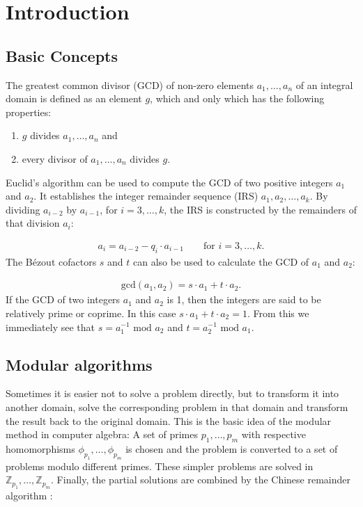 \section{Introduction}

\subsection{Basic Concepts}

The greatest common divisor (GCD) of non-zero elements $a_1, \dots{}, a_n$ of an integral domain is defined as an element $g$, which and only which has the following properties:

\begin{enumerate}
    \item $g$ divides $a_1, \dots{}, a_n$ and
    \item every divisor of $a_1, \dots{}, a_n$ divides $g$.
\end{enumerate}Euclid's algorithm can be used to compute the GCD of two positive integers $a_1$ and $a_2$. It establishes the integer remainder sequence (IRS) \mbox{$a_1, a_2, \dots{}, a_k$}. By dividing $a_{i-2}$ by $a_{i-1}$, for \mbox{$i = 3, \dots{}, k$}, the IRS is constructed by the remainders of that division $a_i$:

\begin{align}
a_i = a_{i-2} - q_i \cdot a_{i-1} \qquad \text{for }  i = 3, \dots{}, k.
\end{align}The  Bézout cofactors $s$ and $t$ can also be used to calculate the GCD of $a_1$ and $a_2$:

\begin{align}
\text{gcd}(a_1, a_2) = s \cdot a_1 + t \cdot a_2.
\end{align}If the GCD of two integers $a_1$ and $a_2$ is 1, then the integers are said to be relatively prime or coprime. In this case \mbox{$s \cdot a_1 + t \cdot a_2 = 1$}. From this we immediately see that $s = a_1^{-1}\text{ mod }a_2$ and $t = a_2^{-1}\text{ mod }a_1$.

\subsection{Modular algorithms}

Sometimes it is easier not to solve a problem directly, but to transform it into another domain, solve the corresponding problem in that domain and transform the result back to the original domain. This is the basic idea of the modular method in computer algebra: A set of primes $p_1, \dots{}, p_m$ with respective homomorphisms $\phi_{p_1}, \dots{}, \phi_{p_m}$ is chosen and the problem is converted to a set of problems modulo different primes. These simpler problems are solved in $\mathbb{Z}_{p_1}, \dots{}, \mathbb{Z}_{p_m}$. Finally, the partial solutions are combined by the Chinese remainder algorithm \cite{winkler1996}:

